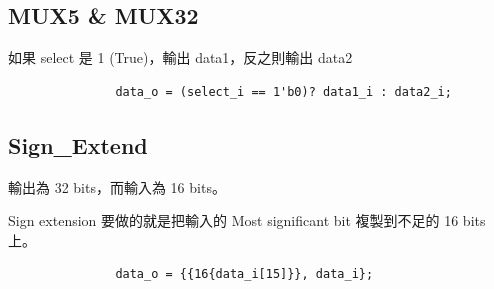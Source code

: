 \documentclass[12t, a4paper]{article}
\begin{document}
\begin{CJK}{UTF8}{bkai}
		\subsection{MUX5 \& MUX32}
			如果 select 是 1 (True)，輸出 data1，反之則輸出 data2 \par
			\begin{verbatim}
			   data_o = (select_i == 1'b0)?	data1_i : data2_i;
			\end{verbatim}

		\subsection{Sign\_Extend}
			輸出為 32 bits，而輸入為 16 bits。 \par
			Sign extension 要做的就是把輸入的 Most significant bit 複製到不足的 16 bits 上。\par
			\begin{verbatim}
			   data_o = {{16{data_i[15]}}, data_i};	
			\end{verbatim}
	
	\clearpage
	\end{CJK}
\end{document}
